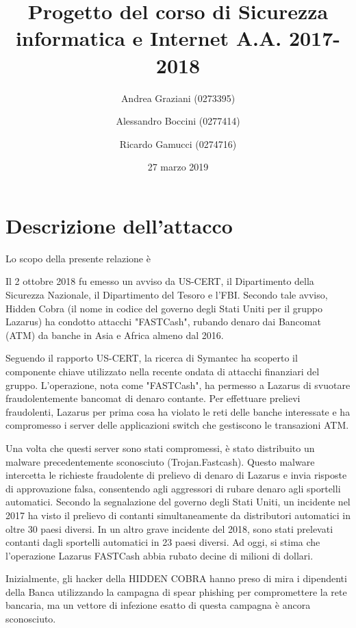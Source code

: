 \documentclass[10pt,a4paper, titlepage]{report}
\title{Progetto del corso di Sicurezza informatica e Internet A.A. 2017-2018}
\author[1]{Andrea Graziani (0273395)}
\author[1]{Alessandro Boccini (0277414)}
\author[1]{Ricardo Gamucci (0274716)}
\affil[1]{Università degli Studi di Roma Tor Vergata}
\date{27 marzo 2019}
\begin{document}
\maketitle
\tableofcontents
\newpage

\chapter{Descrizione dell'attacco}

Lo scopo della presente relazione è

Il 2 ottobre 2018 fu emesso un avviso da US-CERT, il Dipartimento della Sicurezza Nazionale, il Dipartimento del Tesoro e l'FBI. Secondo tale avviso, Hidden Cobra (il nome in codice del governo degli Stati Uniti per il gruppo Lazarus) ha condotto attacchi "FASTCash", rubando denaro dai Bancomat (ATM) da banche in Asia e Africa almeno dal 2016. 

Seguendo il rapporto US-CERT, la ricerca di Symantec ha scoperto il componente chiave utilizzato nella recente ondata di attacchi finanziari del gruppo. L'operazione, nota come "FASTCash", ha permesso a Lazarus di svuotare fraudolentemente bancomat di denaro contante. Per effettuare prelievi fraudolenti, Lazarus per prima cosa ha violato le reti delle banche interessate e ha compromesso i server delle applicazioni switch che gestiscono le transazioni ATM. 

Una volta che questi server sono stati compromessi, è stato distribuito un malware precedentemente sconosciuto (Trojan.Fastcash). Questo malware intercetta le richieste fraudolente di prelievo di denaro di Lazarus e invia risposte di approvazione falsa, consentendo agli aggressori di rubare denaro agli sportelli automatici. 
Secondo la segnalazione del governo degli Stati Uniti, un incidente nel 2017 ha visto il prelievo di contanti simultaneamente da distributori automatici in oltre 30 paesi diversi. In un altro grave incidente del 2018, sono stati prelevati contanti dagli sportelli automatici in 23 paesi diversi. Ad oggi, si stima che l'operazione Lazarus FASTCash abbia rubato decine di milioni di dollari. 

Inizialmente, gli hacker della HIDDEN COBRA hanno preso di mira i dipendenti della Banca utilizzando la campagna di spear phishing per compromettere la rete bancaria, ma un vettore di infezione esatto di questa campagna è ancora sconosciuto.  
\end{document}
